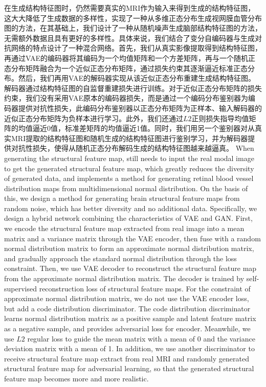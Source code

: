 \documentclass[letterpaper]{article} %
\begin{document}
在生成结构特征图时，\cite{4shin2018medical}仍然需要真实的MRI作为输入来得到生成的结构特征图，这大大降低了生成数据的多样性，\cite{41costa2017towards}实现了一种从多维正态分布生成视网膜血管分布图的方法，在其基础上，我们设计了一种从随机噪声生成脑部结构特征图的方法，无需额外数据且具有更好的多样性。具体来说，我们结合了变分自编码器与生成对抗网络的特点设计了一种混合网络。首先，我们从真实影像提取得到结构特征图，再通过VAE的编码器将其编码为一个均值矩阵和一个方差矩阵，再与一个随机正态分布矩阵融合为一个近似正态分布矩阵，通过损失约束其逐渐逼近标准正态分布。然后，我们再用VAE的解码器实现从该近似正态分布重建生成结构特征图。解码器通过结构特征图的自监督重建损失进行训练。对于近似正态分布矩阵的损失约束，我们没有采用VAE原本的编码器损失，而是通过一个编码分布鉴别器为编码器提供对抗性损失，此编码分布鉴别器以正态分布矩阵为正样本、输入解码器的近似正态分布矩阵为负样本进行学习。此外，我们还通过$L2$正则损失指导均值矩阵的均值逼近0值，标准差矩阵的均值逼近1值。同时，我们用另一个鉴别器对从真实MRI提取的结构特征图和随机生成的结构特征图进行鉴别学习，并为解码器提供对抗性损失，使得从随机正态分布解码生成的结构特征图越来越逼真。
When generating the structural feature map, \cite{4shin2018medical} still needs to input the real modal image to get the generated structural feature map, which greatly reduces the diversity of generated data, and \cite{41costa2017towards} implements a method for generating retinal blood vessel distribution maps from multidimensional normal distribution. On the basis of this, we design a method for generating brain structural feature maps from random noise, which has better diversity and no additional data. 
Specifically, we design a hybrid network combining the characteristics of VAE and GAN. First, we encode the structural feature map extracted from real image into a mean matrix and a variance matrix through the VAE encoder, then fuse with a random normal distribution matrix to form an approximate normal distribution matrix, and gradually approach the standard normal distribution through the loss constraint. Then, we use VAE decoder to reconstruct the structural feature map from the approximate normal distribution matrix. The decoder is trained by self-supervised reconstruction loss of structural feature maps. For the constraint of approximate normal distribution matrix, we do not use the VAE encoder loss, but add a code distribution discriminator. The code distribution discriminator learns normal distribution matrix as a positive sample and latent feature matrix as a negative sample, and provides adversarial loss for encoder. Meanwhile, we use $L2$ regular loss to guide the mean matrix with a mean of 0 and the variance deviation matrix with a mean of 1. In addition, we use another discriminator to receive structural feature map extract from real MRI and randomly generated structural feature map for adversarial learning, so that the generated structural feature map becomes more and more realistic.
\end{document}
